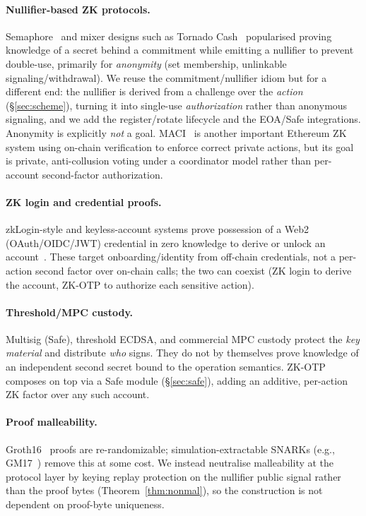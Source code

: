 \documentclass[11pt]{article}
\theoremstyle{definition}
\theoremstyle{plain}
\begin{document}
\paragraph{Nullifier-based ZK protocols.} Semaphore~\cite{semaphore} and mixer designs
such as Tornado Cash~\cite{tornado} popularised proving knowledge of a secret behind a
commitment while emitting a nullifier to prevent double-use, primarily for
\emph{anonymity} (set membership, unlinkable signaling/withdrawal). We reuse the
commitment/nullifier idiom but for a different end: the nullifier is derived from a
challenge over the \emph{action} (\S\ref{sec:scheme}), turning it into single-use
\emph{authorization} rather than anonymous signaling, and we add the register/rotate
lifecycle and the EOA/Safe integrations. Anonymity is explicitly \emph{not} a goal.
MACI~\cite{maci} is another important Ethereum ZK system using on-chain verification
to enforce correct private actions, but its goal is private, anti-collusion voting
under a coordinator model rather than per-account second-factor authorization.

\paragraph{ZK login and credential proofs.} zkLogin-style and keyless-account systems
prove possession of a Web2 (OAuth/OIDC/JWT) credential in zero knowledge to derive or
unlock an account~\cite{zklogin}. These target onboarding/identity from off-chain
credentials, not a per-action second factor over on-chain calls; the two can coexist
(ZK login to derive the account, ZK-OTP to authorize each sensitive action).

\paragraph{Threshold/MPC custody.} Multisig (Safe), threshold ECDSA, and commercial
MPC custody protect the \emph{key material} and distribute \emph{who} signs. They do
not by themselves prove knowledge of an independent second secret bound to the
operation semantics. ZK-OTP composes on top via a Safe module (\S\ref{sec:safe}),
adding an additive, per-action ZK factor over any such account.

\paragraph{Proof malleability.} Groth16~\cite{groth16} proofs are re-randomizable;
simulation-extractable SNARKs (e.g., GM17~\cite{gm17}) remove this at some cost. We
instead neutralise malleability at the protocol layer by keying replay protection on
the nullifier public signal rather than the proof bytes (Theorem~\ref{thm:nonmal}), so
the construction is not dependent on proof-byte uniqueness.
\end{document}

